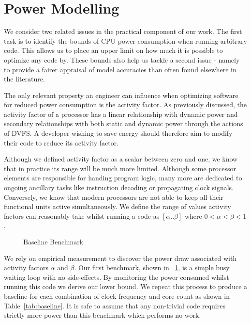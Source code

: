 \section{Power Modelling}
\label{sec:modelling}

We consider two related issues in the practical component of our work. The first task is to identify the bounds of CPU power consumption when running arbitrary code. 
This allows us to place an upper limit on how much it is possible to optimize any code by. These bounds also help us tackle a second issue - namely to provide a fairer appraisal of model accuracies than often found elsewhere in the literature.

The only relevant property an engineer can influence when optimizing software for reduced power consumption is the activity factor. As previously discussed, the activity factor of a processor has a linear relationship with dynamic power and secondary relationships with both static and dynamic power through the actions of DVFS. A developer wishing to save energy should therefore aim to modify their code to reduce its activity factor.

Although we defined activity factor as a scalar between zero and one, we know that in practice its range will be much more limited. Although some processor elements are responsible for handing program logic, many more are dedicated to ongoing ancillary tasks like instruction decoding or propagating clock signals. Conversely, we know that modern processors are not able to keep all their functional units active simultaneously.  We define the range of values activity factors can reasonably take whilst running a code as $[\alpha  .. \beta]$ where $0 < \alpha < \beta < 1$.

\begin{figure}[ht]                                                               
\centering                                                                      
\lstset{basicstyle=\ttfamily\footnotesize\bfseries,                             
      frame=tb}                                                                 
                             
\caption{Baseline Benchmark}                            
\label{fig:nopjmpres}                                                           
\end{figure}  

We rely on empirical measurement to discover the power draw associated with activity factors $\alpha$ and $\beta$. Our first benchmark, shown in \figurename~\ref{fig:nopjmpres}, is a simple busy waiting loop with no side-effects. By monitoring the power consumed whilst running this code we derive our lower bound. We repeat this process to produce a baseline for each combination of clock frequency and core count as shown in Table~\ref{tab:baseline}. It is safe to assume that any non-trivial code requires strictly more power than this benchmark which performs no work.

